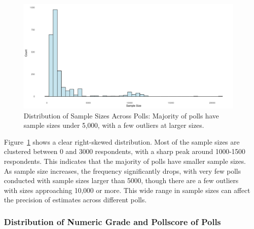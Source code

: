 \documentclass[
  letterpaper,
  DIV=11,
  numbers=noendperiod]{scrartcl}
\begin{document}
\vspace{0.7cm}

\begin{figure}

{\centering \includegraphics{paper_files/figure-pdf/fig-ss-1.pdf}

}

\caption{\label{fig-ss}Distribution of Sample Sizes Across Polls:
Majority of polls have sample sizes under 5,000, with a few outliers at
larger sizes.}

\end{figure}

Figure~\ref{fig-ss} shows a clear right-skewed distribution. Most of the
sample sizes are clustered between 0 and 3000 respondents, with a sharp
peak around 1000-1500 respondents. This indicates that the majority of
polls have smaller sample sizes. As sample size increases, the frequency
significantly drops, with very few polls conducted with sample sizes
larger than 5000, though there are a few outliers with sizes approaching
10,000 or more. This wide range in sample sizes can affect the precision
of estimates across different polls.

\hypertarget{distribution-of-numeric-grade-and-pollscore-of-polls}{%
\subsubsection{Distribution of Numeric Grade and Pollscore of
Polls}\label{distribution-of-numeric-grade-and-pollscore-of-polls}}
\end{document}
